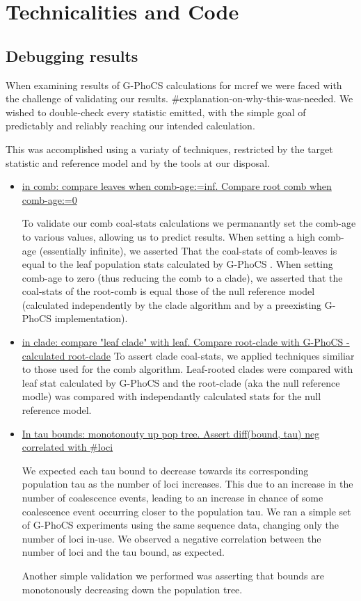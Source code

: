 \documentclass[11pt]{article}
\newcommand{\1}{\mathbbm{1}}
\newcommand{\gp}{G-PhoCS }
\begin{document}
\newpage
\section{Technicalities and Code}


\subsection{Debugging results}

When examining results of \gp calculations for mcref we were faced with the challenge of validating our results. \#explanation-on-why-this-was-needed. We wished to double-check every statistic emitted, with the simple goal of predictably and reliably reaching our intended calculation.

This was accomplished using a variaty of techniques, restricted by the target statistic and reference model and by the tools at our disposal. 


\begin{itemize}

\item \underline{in comb: compare leaves when comb-age:=inf. Compare root comb when comb-age:=0}

To validate our comb coal-stats calculations we permanantly set the comb-age to various values, allowing us to predict results. When setting a high comb-age (essentially infinite), we asserted That the coal-stats of comb-leaves is equal to the leaf population stats calculated by \gp. When setting comb-age to zero (thus reducing the comb to a clade), we asserted that the coal-stats of the root-comb is equal those of the null reference model (calculated independently by the clade algorithm and by a preexisting \gp implementation).



\item \underline{in clade: compare "leaf clade" with leaf. Compare root-clade with \gp -calculated root-clade}
To assert clade coal-stats, we applied techniques similiar to those used for the comb algorithm. Leaf-rooted clades were compared with leaf stat calculated by \gp and the root-clade (aka the null reference modle) was compared with independantly calculated stats for the null reference model. 

\item \underline{In tau bounds: monotonouty up pop tree. Assert diff(bound, tau) neg correlated with \#loci}

We expected each tau bound to decrease towards its corresponding population tau as the number of loci increases. This due to an increase in the number of coalescence events, leading to an increase in chance of some coalescence event occurring closer to the population tau. We ran a simple set of \gp experiments using the same sequence data, changing only the number of loci in-use. We observed a negative correlation between the number of loci and the tau bound, as expected.

Another simple validation we performed was asserting that bounds are monotonously decreasing down the population tree.

\end{itemize}
\end{document}
